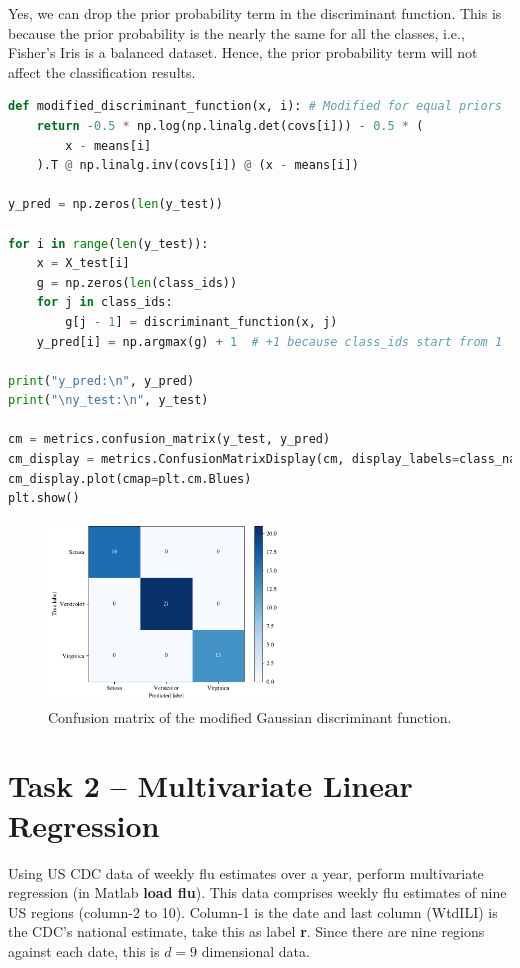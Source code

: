 \documentclass[11pt,a4paper]{article}
\begin{document}
\begin{enumerate}[leftmargin=*]
Yes, we can drop the prior probability term in the discriminant function. This is because the prior probability is the nearly the same for all the classes, i.e., Fisher's Iris is a balanced dataset. Hence, the prior probability term will not affect the classification results.

\begin{lstlisting}[language=Python]
def modified_discriminant_function(x, i): # Modified for equal priors
    return -0.5 * np.log(np.linalg.det(covs[i])) - 0.5 * (
        x - means[i]
    ).T @ np.linalg.inv(covs[i]) @ (x - means[i])

y_pred = np.zeros(len(y_test))

for i in range(len(y_test)):
    x = X_test[i]
    g = np.zeros(len(class_ids))
    for j in class_ids:
        g[j - 1] = discriminant_function(x, j)
    y_pred[i] = np.argmax(g) + 1  # +1 because class_ids start from 1

print("y_pred:\n", y_pred)
print("\ny_test:\n", y_test)

cm = metrics.confusion_matrix(y_test, y_pred)
cm_display = metrics.ConfusionMatrixDisplay(cm, display_labels=class_names)
cm_display.plot(cmap=plt.cm.Blues)
plt.show()
\end{lstlisting}

        \begin{figure}[ht!]
          \centering
          \includegraphics[width=0.55\textwidth]{figs/mod_confusion_matrix.pdf}
          \caption{Confusion matrix of the modified Gaussian discriminant function.}
        \end{figure}

\end{enumerate}

\newpage

\section{Task 2 -- Multivariate Linear Regression}
Using US CDC data of weekly flu estimates over a year, perform multivariate
regression (in Matlab \textbf{load flu}). This data comprises weekly flu estimates of nine US regions (column-2 to 10). Column-1 is the date and last column (WtdILI) is the CDC's national estimate, take this as label \textbf{r}. Since there are nine regions against each date, this is $d=9$ dimensional data.
\end{document}
